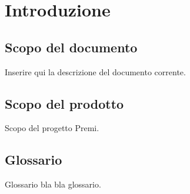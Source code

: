 \section{Introduzione}
\subsection{Scopo del documento}
Inserire qui la descrizione del documento corrente.

\subsection{Scopo del prodotto}
Scopo del progetto Premi.

\subsection{Glossario}
Glossario bla bla glossario.
